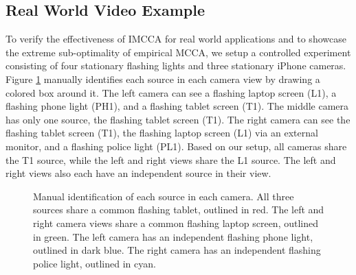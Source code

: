 \subsection{Real World Video Example}\label{sec:real}

To verify the effectiveness of IMCCA for real world applications and to showcase the
extreme sub-optimality of empirical MCCA, we setup a controlled experiment consisting of
four stationary flashing lights and three stationary iPhone cameras. Figure
\ref{fig:chpt10:mcca_sources} manually identifies each source in each camera view by
drawing a colored box around it. The left camera can see a flashing laptop screen (L1), a
flashing phone light (PH1), and a flashing tablet screen (T1). The middle camera has only
one source, the flashing tablet screen (T1). The right camera can see the flashing tablet
screen (T1), the flashing laptop screen (L1) via an external monitor, and a flashing
police light (PL1). Based on our setup, all cameras share the T1 source, while the left
and right views share the L1 source. The left and right views also each have an
independent source in their view.

\begin{figure}
  \begin{center}
    \caption{Manual identification of each source in each camera. All three sources share
      a common flashing tablet, outlined in red. The left and right camera views share a
      common flashing laptop screen, outlined in green. The left camera has an independent
      flashing phone light, outlined in dark blue. The right camera has an independent
      flashing police light, outlined in cyan.}
    \label{fig:chpt10:mcca_sources}
  \end{center}
\end{figure}


